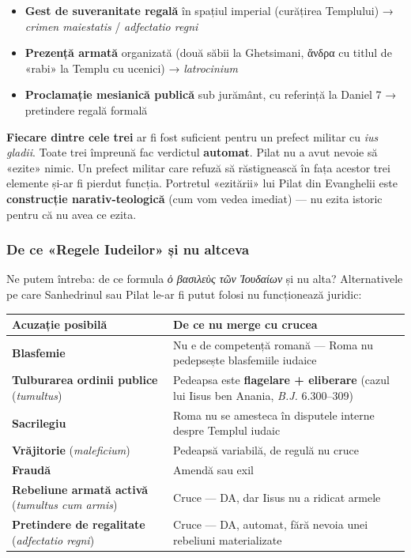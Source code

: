 \documentclass[12pt,a4paper,twoside,openany]{book}
\begin{document}
\begin{itemize}
  \item \textbf{Gest de suveranitate regală} în spațiul imperial (curățirea Templului) → \textit{crimen maiestatis} / \textit{adfectatio regni}
  \item \textbf{Prezență armată} organizată (două săbii la Ghetsimani, ἄνδρα cu titlul de «rabi» la Templu cu ucenici) → \textit{latrocinium}
  \item \textbf{Proclamație mesianică publică} sub jurământ, cu referință la Daniel 7 → pretindere regală formală
\end{itemize}

\textbf{Fiecare dintre cele trei} ar fi fost suficient pentru un prefect militar cu \textit{ius gladii}. Toate trei împreună fac verdictul \textbf{automat}. Pilat nu a avut nevoie să «ezite» nimic. Un prefect militar care refuză să răstignească în fața acestor trei elemente și-ar fi pierdut funcția. Portretul «ezitării» lui Pilat din Evanghelii este \textbf{construcție narativ-teologică} (cum vom vedea imediat) — nu ezita istoric pentru că nu avea ce ezita.

\subsubsection*{De ce «Regele Iudeilor» și nu altceva}

Ne putem întreba: de ce formula \textit{ὁ βασιλεὺς τῶν Ἰουδαίων} și nu alta? Alternativele pe care Sanhedrinul sau Pilat le-ar fi putut folosi nu funcționează juridic:

\begin{center}
\small
\begin{tabularx}{\textwidth}{L{4cm}X}
\toprule
{}
\textbf{Acuzație posibilă} & \textbf{De ce nu merge cu crucea} \\
\midrule
\textbf{Blasfemie} & Nu e de competență romană — Roma nu pedepsește blasfemiile iudaice \\
\textbf{Tulburarea ordinii publice} (\textit{tumultus}) & Pedeapsa este \textbf{flagelare + eliberare} (cazul lui Iisus ben Anania, \textit{B.J.} 6.300--309) \\
\textbf{Sacrilegiu} & Roma nu se amesteca în disputele interne despre Templul iudaic \\
\textbf{Vrăjitorie} (\textit{maleficium}) & Pedeapsă variabilă, de regulă nu cruce \\
\textbf{Fraudă} & Amendă sau exil \\
\textbf{Rebeliune armată activă} (\textit{tumultus cum armis}) & Cruce — DA, dar Iisus nu a ridicat armele \\
\textbf{Pretindere de regalitate} (\textit{adfectatio regni}) & Cruce — DA, automat, fără nevoia unei rebeliuni materializate \\
\bottomrule
\end{tabularx}
\end{center}
\end{document}

